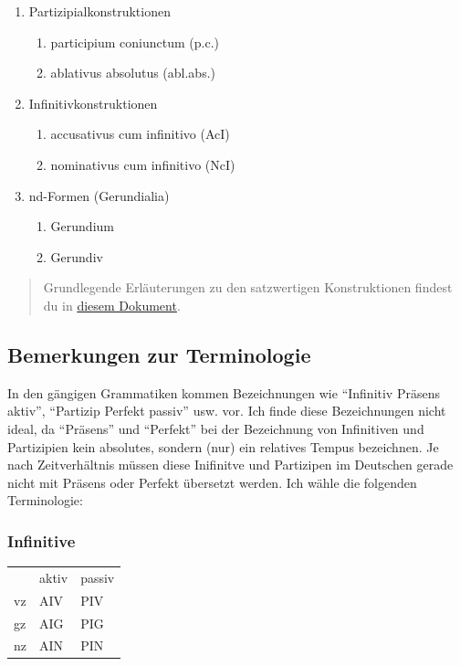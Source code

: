 \documentclass{scrartcl}
\begin{document}
\begin{enumerate}
\item Partizipialkonstruktionen
\begin{enumerate}
\item participium coniunctum (p.c.)
\item ablativus absolutus (abl.abs.)
\end{enumerate}
\item Infinitivkonstruktionen
\begin{enumerate}
\item accusativus cum infinitivo (AcI)
\item nominativus cum infinitivo (NcI)
\end{enumerate}
\item nd-Formen (Gerundialia)
\begin{enumerate}
\item Gerundium
\item Gerundiv
\end{enumerate}
\end{enumerate}

\begin{quote}
Grundlegende Erläuterungen zu den satzwertigen Konstruktionen findest du in \href{https://www.dropbox.com/s/k0ti2cgg8m66et7/Satzwertige\_Konstruktionen.pdf?dl=0}{diesem Dokument}.
\end{quote}

\subsection{Bemerkungen zur Terminologie}
\label{sec:org6659378}

In den gängigen Grammatiken kommen Bezeichnungen wie "`Infinitiv Präsens aktiv"', "`Partizip Perfekt passiv"' usw. vor. Ich finde diese Bezeichnungen nicht ideal, da "`Präsens"' und "`Perfekt"' bei der Bezeichnung von Infinitiven und Partizipien kein absolutes, sondern (nur) ein relatives Tempus bezeichnen. Je nach Zeitverhältnis müssen diese Inifinitve und Partizipen im Deutschen gerade nicht mit Präsens oder Perfekt übersetzt werden. Ich wähle die folgenden Terminologie:

\subsubsection{Infinitive}
\label{sec:orgb1a0e29}

\begin{center}
\begin{tabular}{lll}
 & aktiv & passiv\\
vz & AIV & PIV\\
gz & AIG & PIG\\
nz & AIN & PIN\\
\end{tabular}
\end{center}
\end{document}
